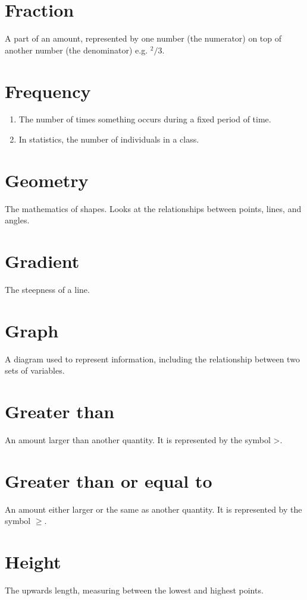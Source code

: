 \documentclass[10pt]{article}
\begin{document}
\section*{Fraction}
A part of an amount, represented by one number (the numerator) on top of another number (the denominator) e.g. ${ }^{2} / 3$.

\section*{Frequency}
\begin{enumerate}
  \item The number of times something occurs during a fixed period of time.
  \item In statistics, the number of individuals in a class.
\end{enumerate}

\section*{Geometry}
The mathematics of shapes. Looks at the relationships between points, lines, and angles.

\section*{Gradient}
The steepness of a line.

\section*{Graph}
A diagram used to represent information, including the relationship between two sets of variables.

\section*{Greater than}
An amount larger than another quantity. It is represented by the symbol >.

\section*{Greater than or equal to}
An amount either larger or the same as another quantity. It is represented by the symbol $\geqslant$.

\section*{Height}
The upwards length, measuring between the lowest and highest points.
\end{document}
